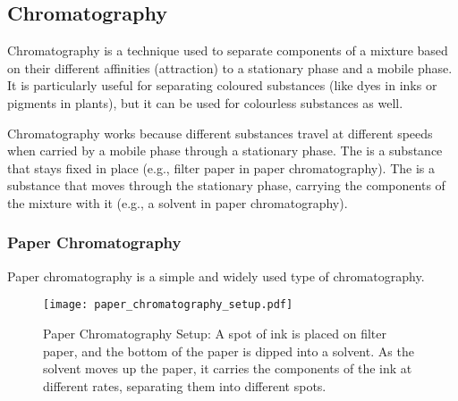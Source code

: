 \subsection{Chromatography}

\begin{keyconcept}{Chromatography}
 is a technique used to separate components of a mixture based on their different affinities (attraction) to a stationary phase and a mobile phase.  It is particularly useful for separating coloured substances (like dyes in inks or pigments in plants), but it can be used for colourless substances as well.
\end{keyconcept}

Chromatography works because different substances travel at different speeds when carried by a mobile phase through a stationary phase. The  is a substance that stays fixed in place (e.g., filter paper in paper chromatography). The  is a substance that moves through the stationary phase, carrying the components of the mixture with it (e.g., a solvent in paper chromatography).


\subsubsection{Paper Chromatography}

Paper chromatography is a simple and widely used type of chromatography.

\begin{figure}
\centering
\texttt{[image: paper\_chromatography\_setup.pdf]}
\caption{Paper Chromatography Setup: A spot of ink is placed on filter paper, and the bottom of the paper is dipped into a solvent. As the solvent moves up the paper, it carries the components of the ink at different rates, separating them into different spots.}
\end{figure}


